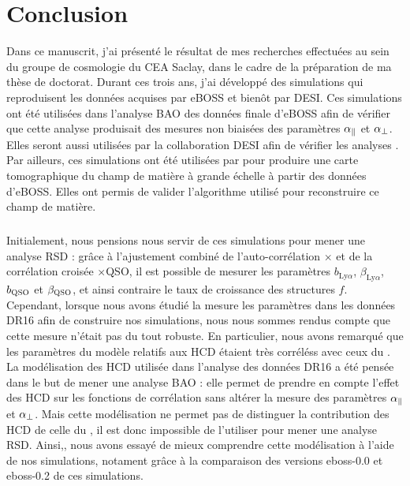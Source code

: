 \chapter*{Conclusion}

Dans ce manuscrit, j'ai présenté le résultat de mes recherches effectuées au sein du groupe de cosmologie du CEA Saclay, dans le cadre de la préparation de ma thèse de doctorat.
Durant ces trois ans, j'ai développé des simulations qui reproduisent les données \lya{} acquises par eBOSS et bienôt par DESI.
Ces simulations ont été utilisées dans l'analyse BAO des données finale d'eBOSS \autocite{DuMasdesBourboux2020} afin de vérifier que cette analyse produisait des mesures non biaisées des paramètres $\alpha_{\parallel}{}$ et $\alpha_{\perp}{}$. Elles seront aussi utilisées par la collaboration DESI afin de vérifier les analyses \lya{}.
Par ailleurs, ces simulations ont été utilisées par \textcite{Ravoux2020} pour produire une carte tomographique du champ de matière à grande échelle à partir des données d'eBOSS. Elles ont permis de valider l'algorithme utilisé pour reconstruire ce champ de matière.

\paragraph{}
Initialement, nous pensions nous servir de ces simulations pour mener une analyse RSD : grâce à l'ajustement combiné de l'auto-corrélation \lya{}$\times$\lya{} et de la corrélation croisée \lya{}$\times$QSO, il est possible de mesurer les paramètres $b_{\mathrm{Ly}\alpha}$, $\beta_{\mathrm{Ly}\alpha}$, $b_{\textsc{QSO}}$ et $\beta_{\textsc{QSO}}$, et ainsi contraire le taux de croissance des structures $f$.
Cependant, lorsque nous avons étudié la mesure les paramètres \lya{} dans les données DR16 afin de construire nos simulations, nous nous sommes rendus compte que cette mesure n'était pas du tout robuste. En particulier, nous avons remarqué que les paramètres du modèle relatifs aux HCD étaient très corréléss avec ceux du \lya{}.
La modélisation des HCD utilisée dans l'analyse des données DR16 a été pensée dans le but de mener une analyse BAO : elle permet de prendre en compte l'effet des HCD sur les fonctions de corrélation sans altérer la mesure des paramètres $\alpha_{\parallel}{}$ et $\alpha_{\perp}$.
Mais cette modélisation ne permet pas de distinguer la contribution des HCD de celle du \lya{}, il est donc impossible de l'utiliser pour mener une analyse RSD.
Ainsi,, nous avons essayé de mieux comprendre cette modélisation à l'aide de nos simulations, notament grâce à la comparaison des versions eboss-0.0 et eboss-0.2 de ces simulations.

